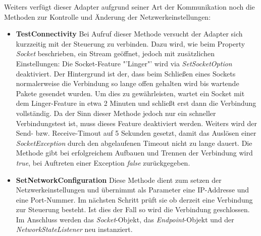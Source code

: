 Weiters verfügt dieser Adapter aufgrund seiner Art der Kommunikation noch die Methoden zur Kontrolle und Änderung der Netzwerkeinstellungen:
\begin{itemize}
\item \textbf{TestConnectivity}
\newline
 Bei Aufruf dieser Methode versucht der Adapter sich kurzzeitig mit der Steuerung zu verbinden. Dazu wird, wie beim Property \textit{Socket} beschrieben, ein Stream geöffnet, jedoch mit zusätzlichen Einstellungen: Die Socket-Feature "'Linger"' wird via \textit{SetSocketOption} deaktiviert. Der Hintergrund ist der, dass beim Schließen eines Sockets normalerweise die Verbindung so lange offen gehalten wird bis wartende Pakete gesendet wurden. Um dies zu gewährleisten, wartet ein Socket mit dem Linger-Feature in etwa 2 Minuten und schließt erst dann die Verbindung vollständig. Da der Sinn dieser Methode jedoch nur ein schneller Verbindungstest ist, muss dieses Feature deaktiviert werden. Weiters wird der Send- bzw. Receive-Timout auf 5 Sekunden gesetzt, damit das Auslösen einer \textit{SocketException} durch den abgelaufenen Timeout nicht zu lange dauert. Die Methode gibt bei erfolgreichem Aufbauen und Trennen der Verbindung wird \textit{true}, bei Auftreten einer Exception \textit{false} zurückgegeben.
\item \textbf{SetNetworkConfiguration}
\newline
Diese Methode dient zum setzen der Netzwerkeinstellungen und übernimmt als Parameter eine IP-Addresse und eine Port-Nummer. Im nächsten Schritt prüft sie ob derzeit eine Verbindung zur Steuerung besteht. Ist dies der Fall so wird die Verbindung geschlossen. Im Anschluss werden das \textit{Socket}-Objekt, das \textit{Endpoint}-Objekt und der \textit{NetworkStateListener} neu instanziert.
\end{itemize}

